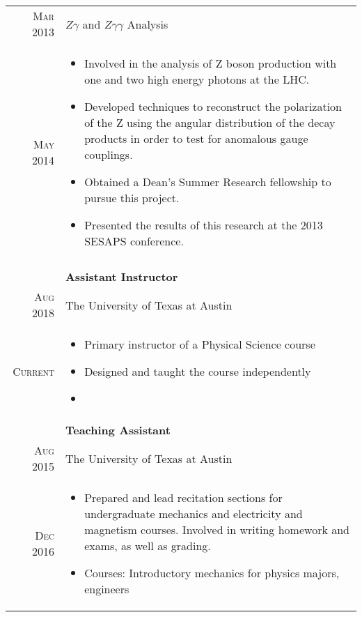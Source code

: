 \documentclass[a4paper,10pt]{article}
\begin{document}
\begin{longtable}{rp{11cm}}
    \textsc{Mar 2013}   &   $Z\gamma$ and $Z\gamma\gamma$ Analysis \\
    \textsc{May 2014}   &   \footnotesize{
    \begin{itemize}[leftmargin=*,topsep=0pt]
        \item Involved in the analysis of Z boson production with one and two high energy photons at the LHC. 
        \item Developed techniques to reconstruct the polarization of the Z using the angular distribution of the decay products in order to test for anomalous gauge couplings. 
        \item Obtained a Dean’s Summer Research fellowship to pursue this project. 
        \item Presented the results of this research at the 2013 SESAPS conference.
    \end{itemize}
    }\\ \\
    
     & \bf{Assistant Instructor}\vspace{2mm} \\
      
     \textsc{Aug 2018}  &   The University of Texas at Austin \\
     \textsc{Current}  &   \footnotesize{ 
     \begin{itemize}[leftmargin=*,topsep=0pt]
        \item Primary instructor of a Physical Science course
        \item Designed and taught the course independently 
        \item 
    \end{itemize}
    }\vspace{2mm}\\
    
     & \bf{Teaching Assistant}\vspace{2mm} \\
      
     \textsc{Aug 2015}  &   The University of Texas at Austin \\
     \textsc{Dec 2016}  &   \footnotesize{ 
     \begin{itemize}[leftmargin=*,topsep=0pt]
        \item Prepared and lead recitation sections for undergraduate mechanics and electricity and magnetism courses. Involved in writing homework and exams, as well as grading.
        \item Courses: Introductory mechanics for physics majors, engineers 
    \end{itemize}
    }\vspace{2mm}\\
    

\end{longtable}
\end{document}
